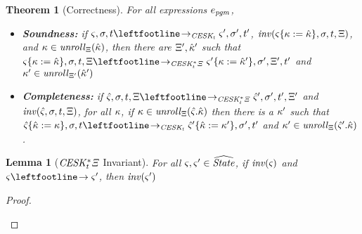\documentclass{article}
\newtheorem{theorem}{Theorem}
\newtheorem{lemma}{Lemma}
\begin{document}
\begin{theorem}[Correctness]\label{thm:pushdown-correct}
  For all expressions $e_\mathit{pgm}$,
  \begin{itemize}
  \item{{\bf Soundness: } %
        if $\mstate,\mstore,\mtime \stepto_{\CESKt} \mstate',\mstore',\mtime'$,
        $\mathit{inv}(\varsigma\{ \kappa := {\hat{\kappa}} \},\sigma,t,\Xi)$,
        and $\kappa \in \mathit{unroll}_{\Xi}({\hat{\kappa}})$, then
        there are $\Xi',{\hat{\kappa}}'$ such that
        $\mstate\set{\mkont := \makont},\mstore,\mtime,\mktab \stepto_{\CESKKstart} \mstate'\set{\mkont := \makont'},\mstore',\mktab',\mtime'$ and $\kappa' \in \mathit{unroll}_{\Xi'}({\hat{\kappa}}')$}
  \item{{\bf Completeness:} if $\mastate,\mstore,\mtime,\mktab \stepto_{\CESKKstart} \mastate',\mstore',\mtime',\mktab'$
      and $\mathit{inv}(\hat\varsigma,\sigma,t,\Xi)$,
      for all $\kappa$, if $\kappa \in \mathit{unroll}_{\Xi}(\hat\varsigma.{\hat{\kappa}})$ then
      there is a $\kappa'$ such that
      $\mastate\set{\makont := \mkont},\mstore,\mtime \stepto_{\CESKt}
       \mastate'\set{\makont := \mkont'},\mstore',\mtime'$ and
       $\kappa' \in \mathit{unroll}_{\Xi}(\hat\varsigma'.{\hat{\kappa}})$.}
  \end{itemize}
\end{theorem}

\begin{lemma}[$\mathit{CESK^*_t\Xi}$ Invariant]\label{lem:invariant}
  For all $\varsigma,\varsigma' \in \widehat{\mathit{State}}$, if $\mathit{inv}(\varsigma)$ and $\mstate \stepto \mstate'$, then $\mathit{inv}(\varsigma')$
\end{lemma}
\begin{proof}
      \begin{byCases}



      \end{byCases}
\end{proof}
\end{document}
